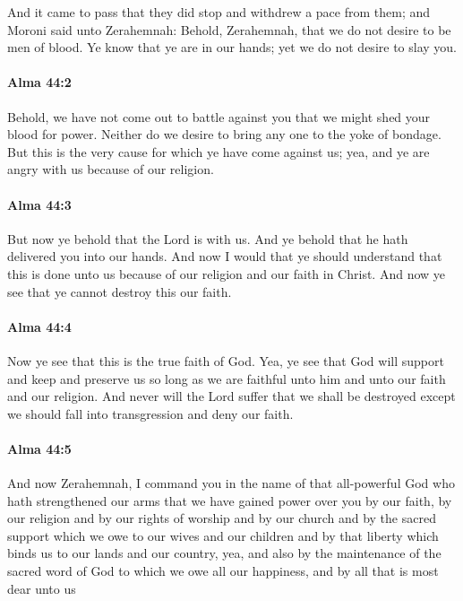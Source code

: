			And it came to pass that they did stop and withdrew a pace from them;
			and Moroni said unto Zerahemnah:
			Behold, Zerahemnah, that we do not desire to be men of blood.
			Ye know that ye are in our hands;
			yet we do not desire to slay you.

		\paragraph{Alma 44:2} %
			\label{ALMA-44-2}

			Behold, we have not come out to battle against you
			that we might shed your blood for power.
			Neither do we desire to bring any one to the yoke of bondage.
			But this is the very cause for which ye have come against us;
			yea, and ye are angry with us because of our religion.

		\paragraph{Alma 44:3} %
			\label{ALMA-44-3}

			But now ye behold that the Lord is with us.
			And ye behold that he hath delivered you into our hands.
			And now I would that ye should understand
			that this is done unto us because of our religion and our faith in Christ.
			And now ye see that ye cannot destroy this our faith.

		\paragraph{Alma 44:4} %
			\label{ALMA-44-4}

			Now ye see that this is the true faith of God.
			Yea, ye see that God will support and keep and preserve us
			so long as we are faithful unto him and unto our faith and our religion.
			And never will the Lord suffer that we shall be destroyed
			except we should fall into transgression and deny our faith.

		\paragraph{Alma 44:5} %
			\label{ALMA-44-5}

			And now Zerahemnah, I command you
			in the name of that all-powerful God who hath strengthened our arms
			that we have gained power over you by our faith,
			by our religion and by our rights of worship and by our church
			and by the sacred support which we owe to our wives and our children
			and by that liberty which binds us to our lands and our country,
			yea, and also by the maintenance of the sacred word of God
			to which we owe all our happiness,
			and by all that is most dear unto us

